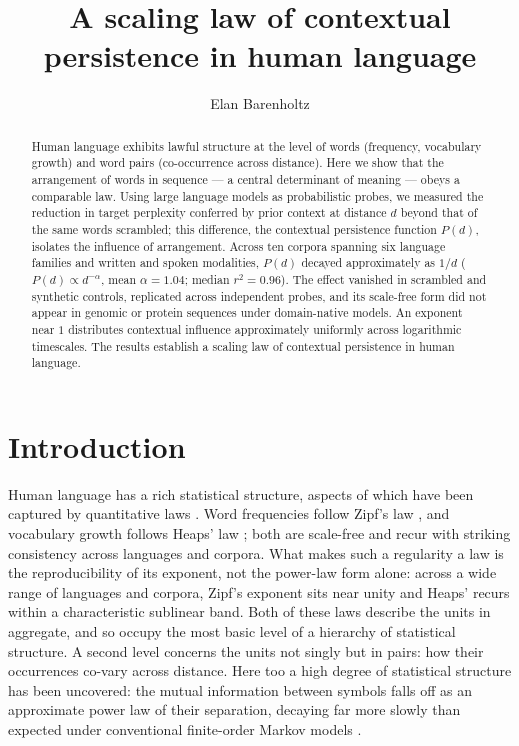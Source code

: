 \documentclass[11pt]{article}
\title{\bfseries A scaling law of contextual persistence in human language}
\author[1]{Elan Barenholtz}
\affil[1]{Machine Perception and Cognitive Robotics Laboratory, Department of Psychology and
Center for Complex Systems, Florida Atlantic University}
\date{}
\begin{document}
\linenumbers
\maketitle

\begin{abstract}
\noindent
Human language exhibits lawful structure at the level of words (frequency,
vocabulary growth) and word pairs (co-occurrence across distance). Here we show that the arrangement of words in
sequence --- a central determinant of meaning --- obeys a comparable law. Using
large language models as probabilistic probes, we measured the reduction in target perplexity
conferred by prior context at distance $d$ beyond that of the same words scrambled;
this difference, the contextual persistence function $P(d)$, isolates the influence of
arrangement. Across ten corpora spanning six language
families and written and spoken modalities, $P(d)$ decayed approximately as $1/d$
($P(d)\propto d^{-\alpha}$, mean $\alpha=1.04$; median $r^2=0.96$). The effect vanished
in scrambled and synthetic controls, replicated across independent probes, and its scale-free
form did not appear in genomic or protein sequences under domain-native models. An exponent near $1$ distributes
contextual influence approximately uniformly across logarithmic timescales. The results
establish a scaling law of contextual persistence in human language.
\end{abstract}

\section{Introduction}

Human language has a rich statistical structure, aspects of which have been captured by quantitative
laws \citep{altmann2016statistical, tanakaishii2021statistical}. Word frequencies follow Zipf's law \citep{zipf1949human}, and
vocabulary growth follows Heaps' law \citep{heaps1978information}; both are scale-free and recur
with striking consistency across languages and corpora. What makes such a regularity a law is the
reproducibility of its exponent, not the power-law form alone: across a wide range of languages and
corpora, Zipf's exponent sits near unity and Heaps' recurs within a characteristic sublinear band.
Both of these laws describe the units in aggregate, and so occupy
the most basic level of a hierarchy of statistical structure. A second level concerns
the units not singly but in pairs: how their occurrences co-vary across distance. Here too a high
degree of statistical structure has been uncovered: the mutual information
between symbols falls off as an approximate power law of their separation, decaying far more slowly
than expected under conventional finite-order Markov models \citep{ebeling1994entropy, lin2017critical, montemurro2002longrange}.
\end{document}
